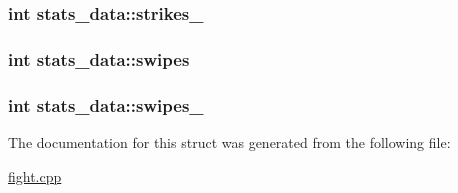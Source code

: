 \hypertarget{structstats__data_adfafae05b4eb951648472534b2ae6415}{
\subsubsection[{strikes\-\_\-2}]{\setlength{\rightskip}{0pt plus 5cm}int stats\-\_\-data\-::strikes\-\_}}\label{structstats__data_adfafae05b4eb951648472534b2ae6415}
\hypertarget{structstats__data_ad13f4120ba1a3d28801e61aad8a72c5b}{
\subsubsection[{swipes}]{\setlength{\rightskip}{0pt plus 5cm}int stats\-\_\-data\-::swipes}}\label{structstats__data_ad13f4120ba1a3d28801e61aad8a72c5b}
\hypertarget{structstats__data_a396ace92f63db8810d0b3a72752cfefe}{
\subsubsection[{swipes\-\_\-2}]{\setlength{\rightskip}{0pt plus 5cm}int stats\-\_\-data\-::swipes\-\_}}\label{structstats__data_a396ace92f63db8810d0b3a72752cfefe}


The documentation for this struct was generated from the following file\-:\begin{DoxyCompactItemize}
\item 
\hyperlink{fight_8cpp}{fight.\-cpp}\end{DoxyCompactItemize}
